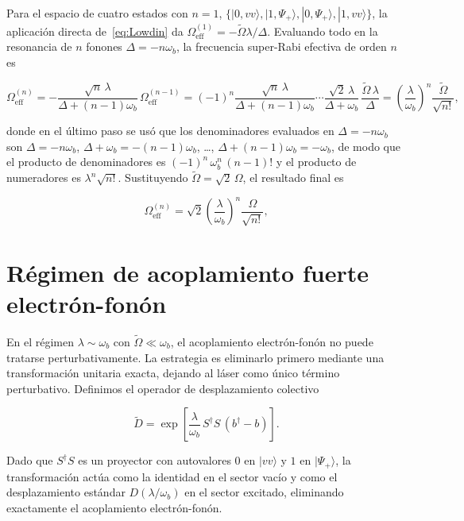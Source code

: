 Para el espacio de cuatro estados con $n=1$, $\{|0,vv\rangle,|1,\Psi_+\rangle,|0,\Psi_+\rangle,|1,vv\rangle\}$, la aplicación directa de~\eqref{eq:Lowdin} da $\Omega_\mathrm{eff}^{(1)} = -\widetilde\Omega\lambda/\Delta$. Evaluando todo en la resonancia de $n$ fonones $\Delta = -n\omega_b$, la frecuencia super-Rabi efectiva de orden $n$ es

\begin{equation*}
	\Omega_\mathrm{eff}^{(n)}
	= -\frac{\sqrt{n}\,\lambda}{\Delta+(n-1)\omega_b}\,
	\Omega_\mathrm{eff}^{(n-1)}
	= (-1)^n
	\frac{\sqrt{n}\,\lambda}{\Delta+(n-1)\omega_b}\cdots
	\frac{\sqrt{2}\,\lambda}{\Delta+\omega_b}\,
	\frac{\widetilde\Omega\,\lambda}{\Delta}
	= \left(\frac{\lambda}{\omega_b}\right)^{\!n}
	\frac{\widetilde\Omega}{\sqrt{n!}},
	\label{eq:Oeff_I_pre}
\end{equation*}

donde en el último paso se usó que los denominadores evaluados en $\Delta = -n\omega_b$ son $\Delta = -n\omega_b$, $\Delta+\omega_b = -(n-1)\omega_b$, \ldots, $\Delta+(n-1)\omega_b = -\omega_b$, de modo que el producto de denominadores es $(-1)^n\,\omega_b^n\,(n-1)!$ y el producto de numeradores es $\lambda^n\sqrt{n!}$. Sustituyendo $\widetilde\Omega = \sqrt{2}\,\Omega$, el resultado final es

\begin{equation}
	\boxed{
		\Omega_\mathrm{eff}^{(n)}
		= \sqrt{2}\left(\frac{\lambda}{\omega_b}\right)^{\!n}
		\frac{\Omega}{\sqrt{n!}},
	}
	\label{eq:resultado}
\end{equation}

\section{Régimen de acoplamiento fuerte electrón-fonón}\label{reg2}

En el régimen $\lambda \sim \omega_b$ con $\widetilde\Omega \ll \omega_b$, el acoplamiento electrón-fonón no puede tratarse perturbativamente. La estrategia es eliminarlo primero mediante una transformación unitaria exacta, dejando al láser como único término perturbativo. Definimos el operador de desplazamiento colectivo

\begin{equation}
	\widetilde{D} = \exp\!\left[
	\frac{\lambda}{\omega_b}\,S^\dagger S\,(b^\dagger - b)
	\right].
	\label{eq:D}
\end{equation}

Dado que $S^\dagger S$ es un proyector con autovalores $0$ en $|vv\rangle$ y $1$ en $|\Psi_+\rangle$, la transformación actúa como la identidad en el sector vacío y como el desplazamiento estándar $D(\lambda/\omega_b)$ en el sector excitado, eliminando exactamente el acoplamiento electrón-fonón.


